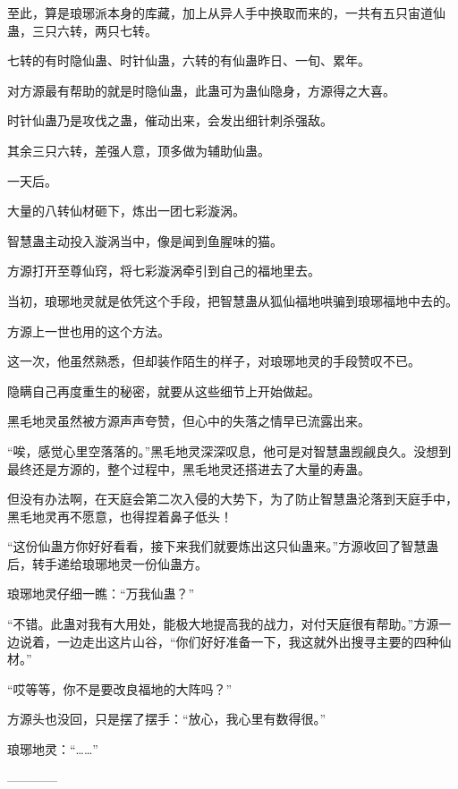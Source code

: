 \begin{this_body}
至此，算是琅琊派本身的库藏，加上从异人手中换取而来的，一共有五只宙道仙蛊，三只六转，两只七转。

七转的有时隐仙蛊、时针仙蛊，六转的有仙蛊昨日、一旬、累年。

对方源最有帮助的就是时隐仙蛊，此蛊可为蛊仙隐身，方源得之大喜。

时针仙蛊乃是攻伐之蛊，催动出来，会发出细针刺杀强敌。

其余三只六转，差强人意，顶多做为辅助仙蛊。

一天后。

大量的八转仙材砸下，炼出一团七彩漩涡。

智慧蛊主动投入漩涡当中，像是闻到鱼腥味的猫。

方源打开至尊仙窍，将七彩漩涡牵引到自己的福地里去。

当初，琅琊地灵就是依凭这个手段，把智慧蛊从狐仙福地哄骗到琅琊福地中去的。

方源上一世也用的这个方法。

这一次，他虽然熟悉，但却装作陌生的样子，对琅琊地灵的手段赞叹不已。

隐瞒自己再度重生的秘密，就要从这些细节上开始做起。

黑毛地灵虽然被方源声声夸赞，但心中的失落之情早已流露出来。

“唉，感觉心里空落落的。”黑毛地灵深深叹息，他可是对智慧蛊觊觎良久。没想到最终还是方源的，整个过程中，黑毛地灵还搭进去了大量的寿蛊。

但没有办法啊，在天庭会第二次入侵的大势下，为了防止智慧蛊沦落到天庭手中，黑毛地灵再不愿意，也得捏着鼻子低头！

“这份仙蛊方你好好看看，接下来我们就要炼出这只仙蛊来。”方源收回了智慧蛊后，转手递给琅琊地灵一份仙蛊方。

琅琊地灵仔细一瞧：“万我仙蛊？”

“不错。此蛊对我有大用处，能极大地提高我的战力，对付天庭很有帮助。”方源一边说着，一边走出这片山谷，“你们好好准备一下，我这就外出搜寻主要的四种仙材。”

“哎等等，你不是要改良福地的大阵吗？”

方源头也没回，只是摆了摆手：“放心，我心里有数得很。”

琅琊地灵：“……”

------------

\end{this_body}

